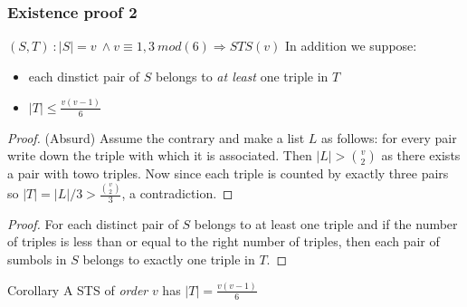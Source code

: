 \begin{frame}
\frametitle{Existence proof 2}
\begin{block}{$(S,T)\ : |S|=v\ \wedge v\equiv 1,3\ mod(6) \Rightarrow STS(v)$}
	In addition we suppose:
	\begin{itemize}
		\item each dinstict pair of $S$ belongs to \textit{at least} one triple in $T$
		\item $|T| \le \frac{v(v-1)}{6}$
	\end{itemize}
\end{block}
\begin{proof}
	(Absurd) Assume the contrary and make a list $L$ as follows: for every pair write down the triple with which it is associated. Then $|L|> \binom{v}{2}$ as there exists a pair with towo triples. Now since each triple is counted by exactly three pairs so $|T| =|L|/3 > \frac{\binom{v}{2}}{3}$, a contradiction.
\end{proof}

\begin{proof}
	For each distinct pair of $S$ belongs to at least one triple and if the number of triples is less than or equal to the right number of triples, then each pair of sumbols in $S$ belongs to exactly one triple in $T$.
\end{proof}
\end{frame}

\begin{frame}
	\begin{center}
		\begin{block}{Corollary}
			A STS of \textit{order} $v$ has $|T|=\frac{v(v-1)}{6}$	
		\end{block}
	\end{center}
\end{frame}